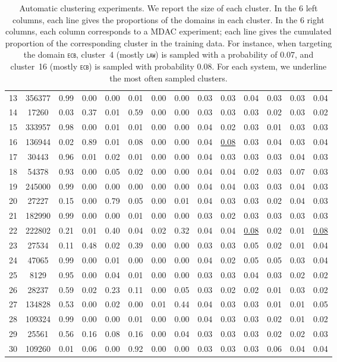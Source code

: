 \documentclass[11pt]{article}
\newcommand{\domain}[1]{\texttt{\textsc{#1}}}
\begin{document}
\begin{table*}[htbp]
\begin{tabular}{|p{0.5cm}|*{7}{c|}|*{6}{c|}}
13&356377&0.99&0.00&0.00&0.01&0.00&0.00&0.03&0.03&0.04&0.03&0.03&0.04 \\
14&17260&0.03&0.37&0.01&0.59&0.00&0.00&0.03&0.03&0.03&0.02&0.03&0.02 \\
15&333957&0.98&0.00&0.01&0.01&0.00&0.00&0.04&0.02&0.03&0.01&0.03&0.03 \\
16&136944&0.02&0.89&0.01&0.08&0.00&0.00&0.04&\underline{0.08}&0.03&0.04&0.03&0.04 \\
17&30443&0.96&0.01&0.02&0.01&0.00&0.00&0.04&0.03&0.03&0.03&0.04&0.03 \\
18&54378&0.93&0.00&0.05&0.02&0.00&0.00&0.04&0.04&0.02&0.03&0.07&0.03 \\
19&245000&0.99&0.00&0.00&0.00&0.00&0.00&0.04&0.04&0.03&0.03&0.04&0.03 \\
20&27227&0.15&0.00&0.79&0.05&0.00&0.01&0.04&0.03&0.03&0.02&0.04&0.03 \\
21&182990&0.99&0.00&0.00&0.01&0.00&0.00&0.03&0.02&0.03&0.03&0.03&0.03 \\
22&222802&0.21&0.01&0.40&0.04&0.02&0.32&0.04&0.04&\underline{0.08}&0.02&0.01&\underline{0.08} \\
23&27534&0.11&0.48&0.02&0.39&0.00&0.00&0.03&0.03&0.05&0.02&0.01&0.04 \\
24&47065&0.99&0.00&0.01&0.00&0.00&0.00&0.04&0.02&0.05&0.05&0.03&0.04 \\
25&8129&0.95&0.00&0.04&0.01&0.00&0.00&0.03&0.03&0.04&0.03&0.02&0.02 \\
26&28237&0.59&0.02&0.23&0.11&0.00&0.05&0.03&0.02&0.02&0.01&0.03&0.02 \\
27&134828&0.53&0.00&0.02&0.00&0.01&0.44&0.04&0.03&0.03&0.01&0.01&0.05 \\
28&109324&0.99&0.00&0.00&0.01&0.00&0.00&0.04&0.03&0.03&0.02&0.01&0.02 \\
29&25561&0.56&0.16&0.08&0.16&0.00&0.04&0.03&0.03&0.03&0.02&0.02&0.03 \\
30&109260&0.01&0.06&0.00&0.92&0.00&0.00&0.03&0.03&0.03&0.06&0.04&0.04 \\
\hline
\end{tabular}
\caption{Automatic clustering experiments. We report the size of each cluster. In the 6 left columns, each line gives the proportions of the domains in each cluster. In the 6 right columns, each column corresponds to a MDAC experiment; each line gives the cumulated proportion of the corresponding cluster in the training data. For instance, when targeting the domain \domain{ecb}, cluster~4 (mostly \domain{law}) is sampled with a probability of $0.07$, and cluster~16 (mostly \domain{ecb}) is sampled with probability $0.08$. For each system, we underline the most often sampled clusters.}
\label{tab:automatic_domains}
\end{table*}
\end{document}

